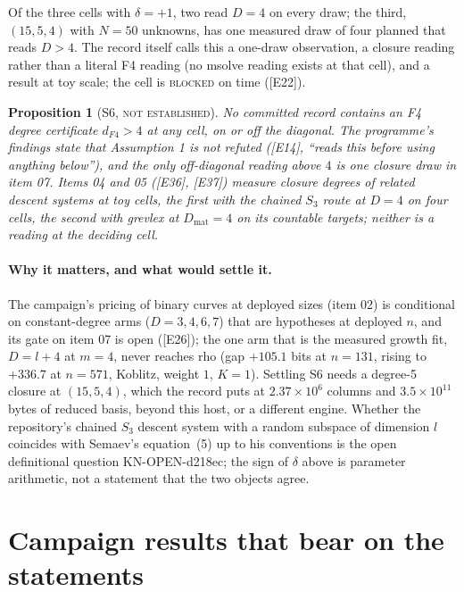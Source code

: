 \documentclass[10pt,a4paper]{article}
\newcommand{\ev}[1]{\textup{[#1]}}
\newtheorem{proposition}[theorem]{Proposition}
\theoremstyle{definition}
\theoremstyle{remark}
\begin{document}
Of the three cells with $\delta=+1$, two read $D=4$ on every draw; the third, $(15,5,4)$
with $N=50$ unknowns, has one measured draw of four planned that reads $D>4$. The record itself calls this
a one-draw observation, a closure reading rather than a literal F4 reading (no msolve
reading exists at that cell), and a result at toy scale; the cell is
\textsc{blocked} on time (\ev{E22}).

\begin{proposition}[S6, \textsc{not established}]
\label{prop:s6}
No committed record contains an F4 degree certificate $d_{F4}>4$ at any cell, on or
off the diagonal. The programme's findings state that Assumption 1 is not refuted
(\ev{E14}, ``reads this before using anything below''), and the only off-diagonal
reading above $4$ is one closure draw in item 07. Items 04 and 05 (\ev{E36}, \ev{E37}) measure closure degrees of related descent systems at toy cells, the first with the chained $S_3$ route at $D=4$ on four cells, the second with grevlex at $D_{\mathrm{mat}}=4$ on its countable targets; neither is a reading at the deciding cell.
\end{proposition}

\paragraph{Why it matters, and what would settle it.}
The campaign's pricing of binary curves at deployed sizes (item 02) is conditional on
constant-degree arms ($D=3,4,6,7$) that are hypotheses at deployed $n$, and its gate on
item 07 is open (\ev{E26}); the one arm that is the measured growth fit, $D=l+4$ at
$m=4$, never reaches rho (gap $+105.1$ bits at $n=131$, rising to $+336.7$ at $n=571$,
Koblitz, weight $1$, $K=1$). Settling S6 needs a degree-5 closure at $(15,5,4)$, which
the record puts at $2.37\times10^{6}$ columns and $3.5\times10^{11}$ bytes of reduced
basis, beyond this host, or a different engine. Whether the repository's chained
$S_3$ descent system with a random subspace of dimension $l$ coincides with
Semaev's equation~(5) up to his conventions is the open definitional question
KN-OPEN-d218ec; the sign of $\delta$ above is parameter arithmetic, not a statement
that the two objects agree.

\section{Campaign results that bear on the statements}
\label{sec:campaign}
\end{document}
